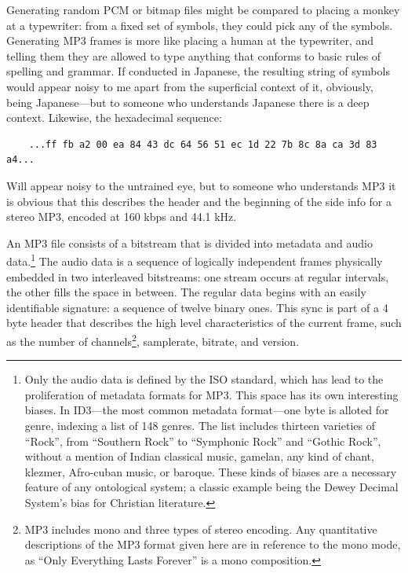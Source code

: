 \documentclass{thesis}
\begin{document}
Generating random PCM or bitmap files might be compared to placing a monkey at a typewriter: from a fixed set of symbols, they could pick any of the symbols. Generating MP3 frames is more like placing a human at the typewriter, and telling them they are allowed to type anything that conforms to basic rules of spelling and grammar. If conducted in Japanese, the resulting string of symbols would appear noisy to me apart from the superficial context of it, obviously, being Japanese---but to someone who understands Japanese there is a deep context. Likewise, the hexadecimal sequence:
	
	\begin{verbatim}
	...ff fb a2 00 ea 84 43 dc 64 56 51 ec 1d 22 7b 8c 8a ca 3d 83 a4...
	\end{verbatim}
	
Will appear noisy to the untrained eye, but to someone who understands MP3 it is obvious that this describes the header and the beginning of the side info for a stereo MP3, encoded at 160 kbps and 44.1 kHz.

An MP3 file consists of a bitstream that is divided into metadata and audio data.\footnote{Only the audio data is defined by the ISO standard, which has lead to the proliferation of metadata formats for MP3. This space has its own interesting biases. In ID3---the most common metadata format---one byte is alloted for genre, indexing a list of 148 genres. The list includes thirteen varieties of ``Rock'', from ``Southern Rock'' to ``Symphonic Rock'' and ``Gothic Rock'', without a mention of Indian classical music, gamelan, any kind of chant, klezmer, Afro-cuban music, or baroque. These kinds of biases are a necessary feature of any ontological system; a classic example being the Dewey Decimal System's bias for Christian literature.} The audio data is a sequence of logically independent frames physically embedded in two interleaved bitstreams: one stream occurs at regular intervals, the other fills the space in between. The regular data begins with an easily identifiable signature: a sequence of twelve binary ones. This sync is part of a 4 byte header that describes the high level characteristics of the current frame, such as the number of channels\footnote{MP3 includes mono and three types of stereo encoding. Any quantitative descriptions of the MP3 format given here are in reference to the mono mode, as ``Only Everything Lasts Forever'' is a mono composition.}, samplerate, bitrate, and version.
	
\end{document}
